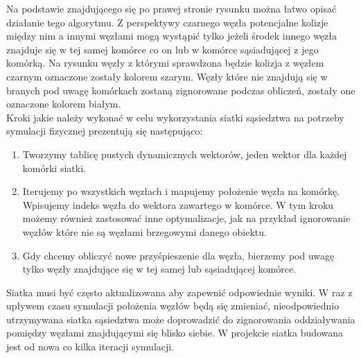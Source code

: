 \documentclass[12pt, letterpaper]{report}
\begin{document}
    Na podstawie znajdującego się po prawej stronie rysunku można łatwo opisać
    działanie tego algorytmu. Z perspektywy czarnego węzła
    potencjalne kolizje między nim a innymi węzłami mogą wystąpić tylko 
    jeżeli środek innego węzła znajduje się w tej 
    samej komórce co on lub w komórce sąsiadującej z jego komórką. Na rysunku 
    węzły z którymi sprawdzona będzie kolizja z węzłem czarnym oznaczone zostały
    kolorem szarym. Węzły które nie znajdują się w branych pod uwagę komórkach 
    zostaną zignorowane podczas obliczeń, zostały one oznaczone kolorem białym. \\

    Kroki jakie należy wykonać w celu wykorzystania siatki sąsiedztwa na 
    potrzeby symulacji fizycznej prezentują się następująco:
    \begin{enumerate}
        \item Tworzymy tablicę pustych dynamicznych wektorów, jeden wektor dla każdej komórki siatki.

        \item Iterujemy po wszystkich węzłach i mapujemy położenie węzła na komórkę. Wpisujemy indeks węzła 
        do wektora zawartego w komórce. W tym kroku możemy również zastosować inne optymalizacje, jak na przykład 
        ignorowanie węzłów które nie są węzłami brzegowymi danego obiektu.

        \item Gdy chcemy obliczyć nowe przyśpieszenie dla węzła, bierzemy pod uwagę tylko węzły znajdujące 
        się w tej samej lub sąsiadującej komórce.
    \end{enumerate}

    Siatka musi być często aktualizowana aby zapewnić odpowiednie wyniki. W raz z upływem czasu symulacji położenia
    węzłów będą się zmieniać, nieodpowiednio utrzymywana siatka sąsiedztwa może doprowadzić do zignorowania 
    oddziaływania pomiędzy węzłami znajdującymi się blisko siebie. W projekcie siatka budowana jest od nowa 
    co kilka iteracji symulacji.
    
\end{document}
